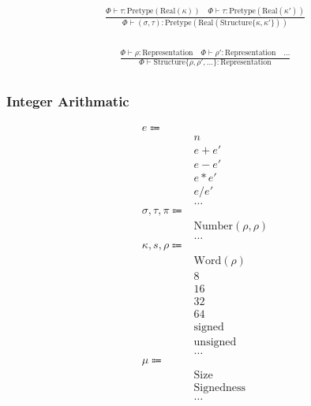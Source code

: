 \documentclass {article}
\begin{document}
\begin{gather*}
\frac
{\Phi \vdash \tau : \text{Pretype} (\text{Real} (\kappa)) \quad \Phi \vdash \tau : \text{Pretype} (\text{Real} (\kappa')) }
{\Phi \vdash (\sigma, \tau) : \text{Pretype} (\text{Real} (\text{Structure} \{ \kappa,\kappa'\} ))} \\
\end{gather*}


\begin{gather*}
\frac
{\Phi \vdash \rho : \text{Representation} \quad \Phi \vdash \rho' : \text{Representation} \quad \dots}
{\Phi \vdash \text{Structure} \{ \rho, \rho', \dots \} : \text{Representation} } \\
\end{gather*}

\subsubsection{Integer Arithmatic}
\begin{align*}
e \Coloneqq & \\
& n \tag{Numeric Literal} \\
& e + e' \tag{Addition} \\
& e - e' \tag{Subtraction} \\
& e * e' \tag{Multiplication} \\
& e / e' \tag{Division} \\
& \dots \\
\sigma, \tau, \pi \Coloneqq & \\
& \text{Number} (\rho, \rho) \tag{Number} \\
& \dots \\
\kappa, s, \rho \Coloneqq & \\
& \text{Word} (\rho) \tag{Word Representation} \\
& 8 \tag{Byte Size} \\
& 16 \tag{Short Size} \\
& 32 \tag{Int Size} \\
& 64 \tag{Long Size} \\
& \text{signed} \tag{Signed} \\
& \text{unsigned} \tag{Unsigned} \\
& \dots \\
\mu \Coloneqq & \\
& \text{Size} \\
& \text{Signedness} \\
& \dots
\end{align*}
\end{document}
